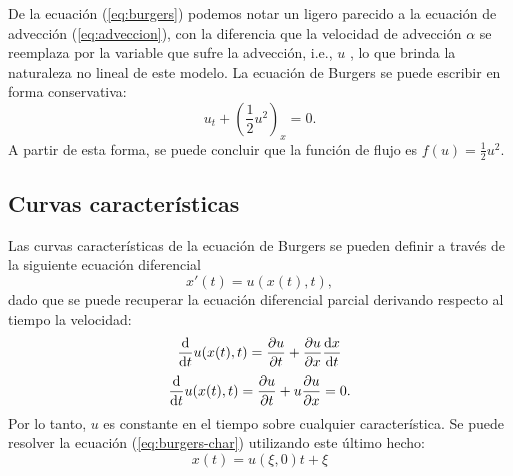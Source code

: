 De la ecuación (\ref{eq:burgers}) podemos notar un ligero parecido a la ecuación de advección (\ref{eq:adveccion}), con la diferencia que la velocidad de advección $\alpha$ se reemplaza por la variable que sufre la advección, i.e., $u$ \cite{Leveque}, lo que brinda la naturaleza no lineal de este modelo. La ecuación de Burgers se puede escribir en forma conservativa:
\begin{equation}
	u_t + \left(\frac{1}{2}u^{2}\right)_x = 0.
	\label{eq:burgers-cons}
\end{equation}
A partir de esta forma, se puede concluir que la función de flujo es $f(u) = \frac{1}{2}u^{2}$.
\subsection{Curvas características}
Las curvas características de la ecuación de Burgers se pueden definir a través de la siguiente ecuación diferencial \cite{Leveque}
\begin{equation}
	x'(t) = u(x(t),t),
	\label{eq:burgers-char}
\end{equation}
dado que se puede recuperar la ecuación diferencial parcial derivando respecto al tiempo la velocidad:
\begin{equation}
	\dv{t} u(x(t),t) = \pdv{u}{t} + \pdv{u}{x} \dv{x}{t}
\end{equation}
\begin{equation}
	\dv{t} u(x(t),t) = \pdv{u}{t} + u\pdv{u}{x} = 0.
\end{equation}
Por lo tanto, $u$ es constante en el tiempo sobre cualquier característica. Se puede resolver la ecuación (\ref{eq:burgers-char}) utilizando este último hecho:
\begin{equation}
	x(t) = u(\xi,0)t + \xi
\end{equation}